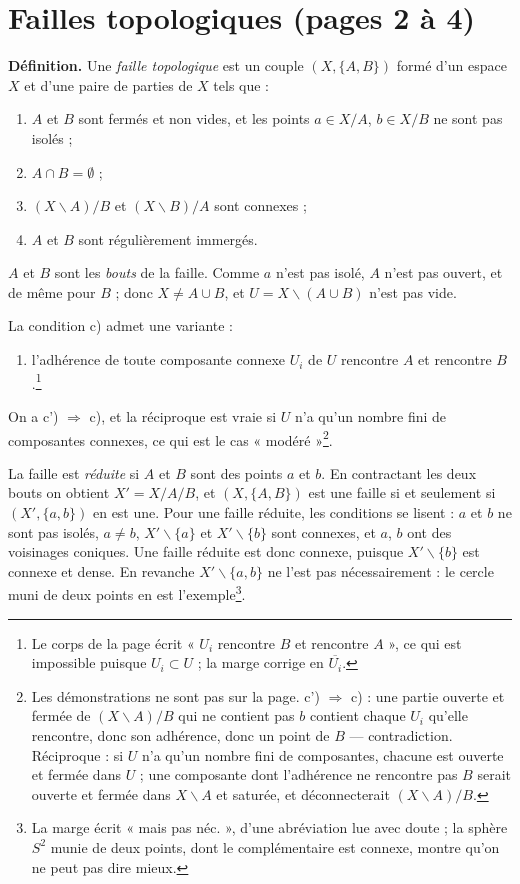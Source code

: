 \documentclass[11pt,a4paper]{article}
\begin{document}
\section*{Failles topologiques (pages 2 à 4)}

\textbf{Définition.} Une \emph{faille topologique} est un couple $(X, \{A,B\})$
formé d'un espace $X$ et d'une paire de parties de $X$ tels que :
\begin{enumerate}
\item[a)] $A$ et $B$ sont fermés et non vides, et les points $a \in X/A$,
$b \in X/B$ ne sont pas isolés ;
\item[b)] $A \cap B = \emptyset$ ;
\item[c)] $(X \smallsetminus A)/B$ et $(X \smallsetminus B)/A$ sont connexes ;
\item[d)] $A$ et $B$ sont régulièrement immergés.
\end{enumerate}

$A$ et $B$ sont les \emph{bouts} de la faille. Comme $a$ n'est pas isolé, $A$
n'est pas ouvert, et de même pour $B$ ; donc $X \neq A \cup B$, et
$U = X \smallsetminus (A \cup B)$ n'est pas vide.

La condition c) admet une variante :
\begin{enumerate}
\item[c')] l'adhérence de toute composante connexe $U_{i}$ de $U$ rencontre $A$
et rencontre $B$.\footnote{Le corps de la page écrit « $U_{i}$ rencontre $B$ et
rencontre $A$ », ce qui est impossible puisque $U_{i} \subset U$ ; la marge
corrige en $\overline{U_{i}}$.}
\end{enumerate}
On a c') $\Rightarrow$ c), et la réciproque est vraie si $U$ n'a qu'un nombre
fini de composantes connexes, ce qui est le cas « modéré »\footnote{Les
démonstrations ne sont pas sur la page. c') $\Rightarrow$ c) : une partie
ouverte et fermée de $(X \smallsetminus A)/B$ qui ne contient pas $b$ contient
chaque $U_{i}$ qu'elle rencontre, donc son adhérence, donc un point de $B$ ---
contradiction. Réciproque : si $U$ n'a qu'un nombre fini de composantes, chacune
est ouverte et fermée dans $U$ ; une composante dont l'adhérence ne rencontre pas
$B$ serait ouverte et fermée dans $X \smallsetminus A$ et saturée, et
déconnecterait $(X \smallsetminus A)/B$.}.

La faille est \emph{réduite} si $A$ et $B$ sont des points $a$ et $b$. En
contractant les deux bouts on obtient $X' = X/A/B$, et $(X, \{A,B\})$ est une
faille si et seulement si $(X', \{a,b\})$ en est une. Pour une faille réduite,
les conditions se lisent : $a$ et $b$ ne sont pas isolés, $a \neq b$,
$X' \smallsetminus \{a\}$ et $X' \smallsetminus \{b\}$ sont connexes, et $a$, $b$
ont des voisinages coniques. Une faille réduite est donc connexe, puisque
$X' \smallsetminus \{b\}$ est connexe et dense. En revanche
$X' \smallsetminus \{a,b\}$ ne l'est pas nécessairement : le cercle muni de deux
points en est l'exemple\footnote{La marge écrit « mais pas néc. », d'une
abréviation lue avec doute ; la sphère $S^{2}$ munie de deux points, dont le
complémentaire est connexe, montre qu'on ne peut pas dire mieux.}.
\end{document}
